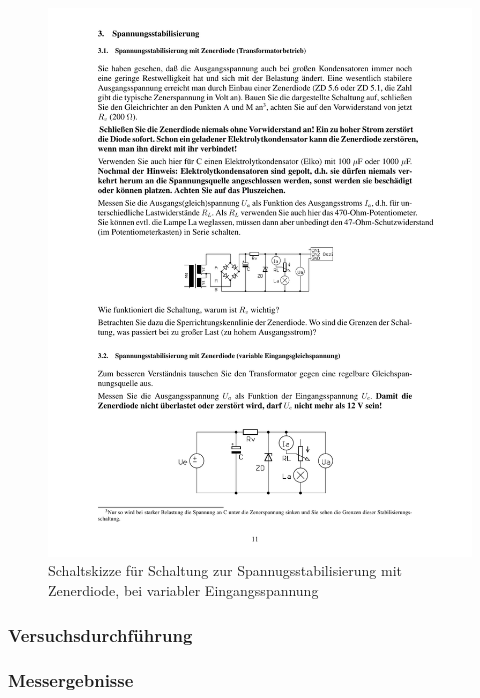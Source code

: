 \documentclass[12pt,a4paper]{article}
\begin{document}
\begin{figure}[H] 
  \centering
    \includegraphics[trim = 10mm 30mm 10mm 213mm, clip, scale = 1]{ep2_14[Page11].pdf}
  	\caption[Schaltskizze für Schaltung zur Spannugsstabilisierung mit Zenerdiode, bei variabler Eingangsspannung]{Schaltskizze für Schaltung zur Spannugsstabilisierung mit Zenerdiode, bei variabler Eingangsspannung\footnotemark}
  \label{fig:2_9}
\end{figure}


\subsubsection{Versuchsdurchführung}

\subsubsection{Messergebnisse}
\end{document}
